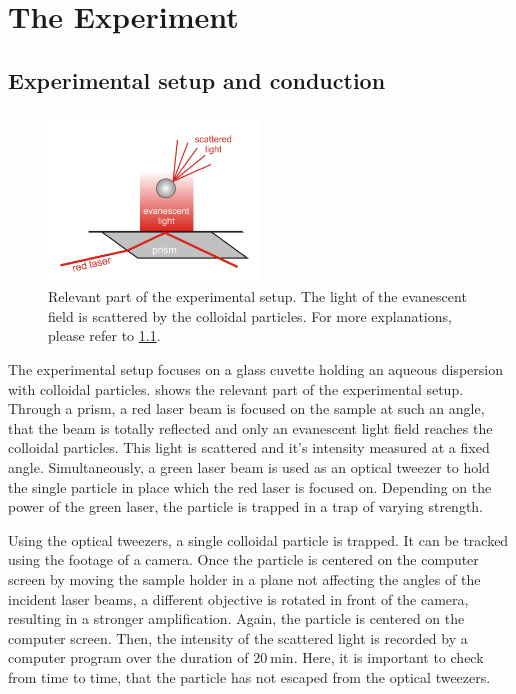 \documentclass[../bericht.tex]{subfiles}
\begin{document}
  \chapter{The Experiment}

    \section{Experimental setup and conduction}
    \label{sec:exp-setup}

      \begin{figure}[bt]
        \centering
        \includegraphics[width=0.5\textwidth]{figures/eyp_setup.png}
        \caption{Relevant part of the experimental setup. The light of the evanescent field is scattered by the colloidal particles. For more explanations, please refer to \cref{sec:exp-setup}.}
        \label{fig:exp-setup}
      \end{figure}

      The experimental setup focuses on a glass cuvette holding an aqueous dispersion with colloidal particles.  shows the relevant part of the experimental setup. Through a prism, a red laser beam is focused on the sample at such an angle, that the beam is totally reflected and only an evanescent light field reaches the colloidal particles. This light is scattered and it's intensity measured at a fixed angle. Simultaneously, a green laser beam is used as an optical tweezer to hold the single particle in place which the red laser is focused on. Depending on the power of the green laser, the particle is trapped in a trap of varying strength.
      \medskip

      Using the optical tweezers, a single colloidal particle is trapped. It can be tracked using the footage of a camera. Once the particle is centered on the computer screen by moving the sample holder in a plane not affecting the angles of the incident laser beams, a different objective is rotated in front of the camera, resulting in a stronger amplification. Again, the particle is centered on the computer screen. Then, the intensity of the scattered light is recorded by a computer program over the duration of $\SI{20}{\minute}$. Here, it is important to check from time to time, that the particle has not escaped from the optical tweezers.
\end{document}
